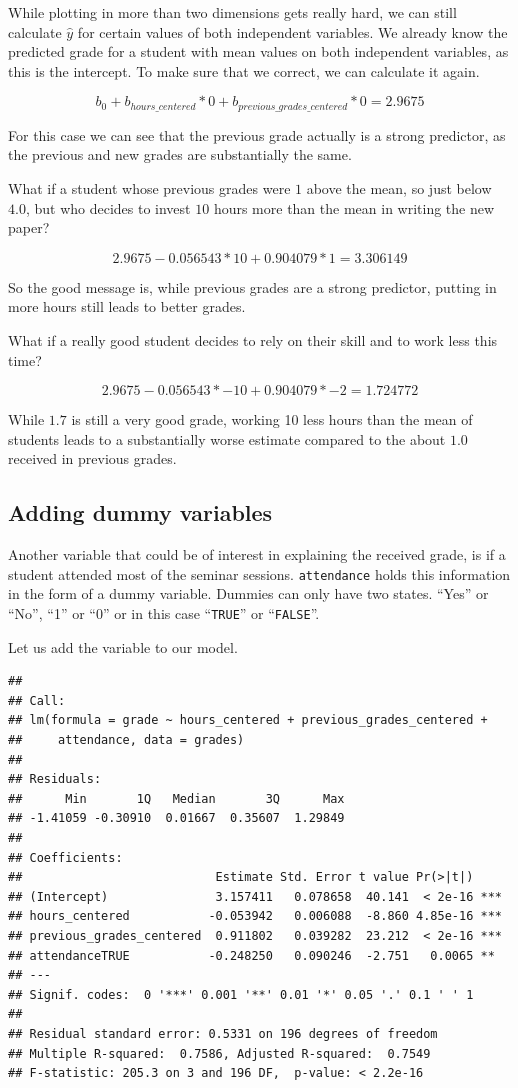 \documentclass[
]{book}
\begin{document}
While plotting in more than two dimensions gets really hard, we can still
calculate \(\hat{y}\) for certain values of both independent variables.
We already know the predicted grade for a student with mean values on both
independent variables, as this is the intercept. To make sure that we correct,
we can calculate it again.

\[b_0 + b_{hours\_centered}*0 + b_{previous\_grades\_centered}*0 = 2.9675\]

For this case we can see that the previous grade actually is a strong
predictor, as the previous and new grades are substantially the same.

What if a student whose previous grades were \(1\) above the mean, so just below
\(4.0\), but who decides to invest \(10\) hours more than the mean in writing the new paper?

\[2.9675 - 0.056543 * 10 + 0.904079 * 1 = 3.306149\]

So the good message is, while previous grades are a strong predictor, putting in
more hours still leads to better grades.

What if a really good student decides to rely on their skill and to work less
this time?

\[2.9675 - 0.056543 * -10 + 0.904079 * -2 = 1.724772\]

While \(1.7\) is still a very good grade, working 10 less hours than the mean of
students leads to a substantially worse estimate compared to the about \(1.0\)
received in previous grades.

\hypertarget{adding-dummy-variables}{%
\subsection{Adding dummy variables}\label{adding-dummy-variables}}

Another variable that could be of interest in explaining the received grade,
is if a student attended most of the seminar sessions.
\texttt{attendance} holds this information in the form of a dummy variable. Dummies can
only have two states. ``Yes'' or ``No'', ``1'' or ``0'' or in this case ``\texttt{TRUE}'' or
``\texttt{FALSE}''.

Let us add the variable to our model.

\begin{verbatim}
## 
## Call:
## lm(formula = grade ~ hours_centered + previous_grades_centered + 
##     attendance, data = grades)
## 
## Residuals:
##      Min       1Q   Median       3Q      Max 
## -1.41059 -0.30910  0.01667  0.35607  1.29849 
## 
## Coefficients:
##                           Estimate Std. Error t value Pr(>|t|)    
## (Intercept)               3.157411   0.078658  40.141  < 2e-16 ***
## hours_centered           -0.053942   0.006088  -8.860 4.85e-16 ***
## previous_grades_centered  0.911802   0.039282  23.212  < 2e-16 ***
## attendanceTRUE           -0.248250   0.090246  -2.751   0.0065 ** 
## ---
## Signif. codes:  0 '***' 0.001 '**' 0.01 '*' 0.05 '.' 0.1 ' ' 1
## 
## Residual standard error: 0.5331 on 196 degrees of freedom
## Multiple R-squared:  0.7586, Adjusted R-squared:  0.7549 
## F-statistic: 205.3 on 3 and 196 DF,  p-value: < 2.2e-16
\end{verbatim}
\end{document}
